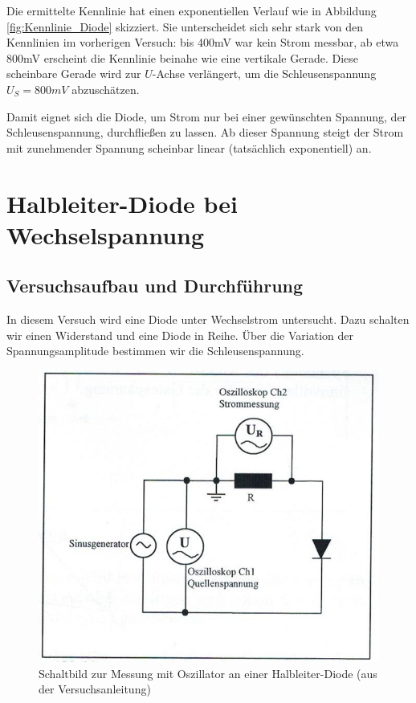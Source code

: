 \documentclass{scrartcl}
\begin{document}
Die ermittelte Kennlinie hat einen exponentiellen Verlauf wie in Abbildung \ref{fig:Kennlinie_Diode} skizziert. Sie unterscheidet sich sehr stark von den Kennlinien im vorherigen Versuch: bis 400mV war kein Strom messbar, ab etwa 800mV erscheint die Kennlinie beinahe wie eine vertikale Gerade. Diese scheinbare Gerade wird zur $U$-Achse verlängert, um die Schleusenspannung $U_{S} = 800mV$ abzuschätzen.

Damit eignet sich die Diode, um Strom nur bei einer gewünschten Spannung, der Schleusenspannung, durchfließen zu lassen. Ab dieser Spannung steigt der Strom mit zunehmender Spannung scheinbar linear (tatsächlich exponentiell) an. 


\pagebreak
\section{Halbleiter-Diode bei Wechselspannung}
\subsection{Versuchsaufbau und Durchführung}
In diesem Versuch wird eine Diode unter Wechselstrom untersucht. Dazu schalten wir einen Widerstand und eine Diode in Reihe. Über die Variation der Spannungsamplitude bestimmen wir die Schleusenspannung.  
\begin{figure}[H]
  \centering
    \includegraphics[scale=0.75]{Aufbau3.JPG}
  \caption{Schaltbild zur Messung mit Oszillator an einer Halbleiter-Diode (aus der Versuchsanleitung)}
  \label{fig:Aufbau3}
\end{figure}
\end{document}
